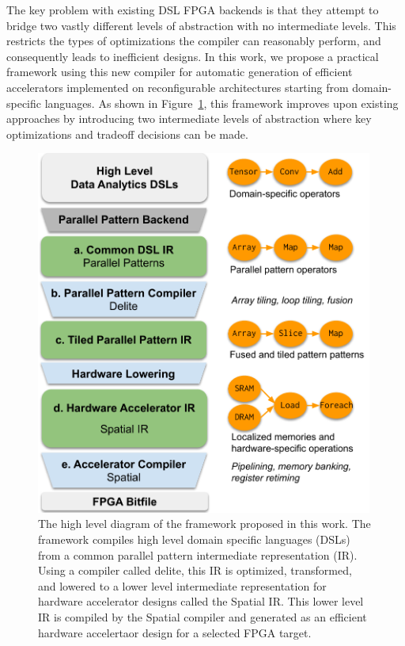 The key problem with existing DSL FPGA backends is that they attempt
to bridge two vastly different levels of abstraction with no intermediate
levels. This restricts the types of optimizations the compiler can reasonably
perform, and consequently leads to inefficient designs.
In this work, we propose a practical framework using this
new compiler for automatic generation of
efficient accelerators implemented on reconfigurable architectures starting
from domain-specific languages. As shown in Figure~\ref{fig:system-diag}, this
framework improves upon existing approaches by introducing two intermediate levels of
abstraction where key optimizations and tradeoff decisions can be made.

\begin{figure}
\centering
\includegraphics[height=12cm]{1-intro/figs/system-diag}
\caption{\label{fig:system-diag}The high level diagram of the framework proposed in this work.
The framework compiles high level domain specific languages (DSLs) from a
common parallel pattern intermediate representation (IR). Using a compiler
called delite, this IR is optimized, transformed, and lowered to a lower level
intermediate representation for hardware accelerator designs called the Spatial IR.
This lower level IR is compiled by the Spatial compiler and generated
as an efficient hardware accelertaor design for a selected FPGA target.}
\end{figure}

